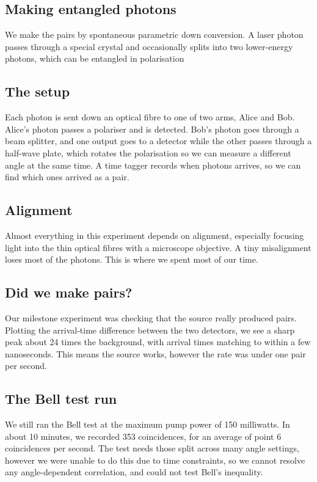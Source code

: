 \documentclass{article}
\begin{document}
\subsection{Making entangled photons}
We make the pairs by spontaneous parametric down conversion. A laser photon passes through a special crystal and occasionally splits into two lower-energy photons, which can be entangled in polarisation

\subsection{The setup}
Each photon is sent down an optical fibre to one of two arms, Alice and Bob. Alice's photon passes a polariser and is detected. Bob's photon goes through a beam splitter, and one output goes to a detector while the other passes through a half-wave plate, which rotates the polarisation so we can measure a different angle at the same time. A time tagger records when photons arrives, so we can find which ones arrived as a pair.

\subsection{Alignment}
Almost everything in this experiment depends on alignment, especially focusing light into the thin optical fibres with a microscope objective. A tiny misalignment loses most of the photons. This is where we spent most of our time.

\subsection{Did we make pairs?}
Our milestone experiment was checking that the source really produced pairs. Plotting the arrival-time difference between the two detectors, we see a sharp peak about 24 times the background, with arrival times matching to within a few nanoseconds. This means the source works, however the rate was under one pair per second.

\subsection{The Bell test run}
We still ran the Bell test at the maximum pump power of 150 milliwatts. In about 10 minutes, we recorded 353 coincidences, for an average of point 6 coincidences per second. The test needs those split across many angle settings, however we were unable to do this due to time constraints, so we cannot resolve any angle-dependent correlation, and could not test Bell's inequality.
\end{document}
